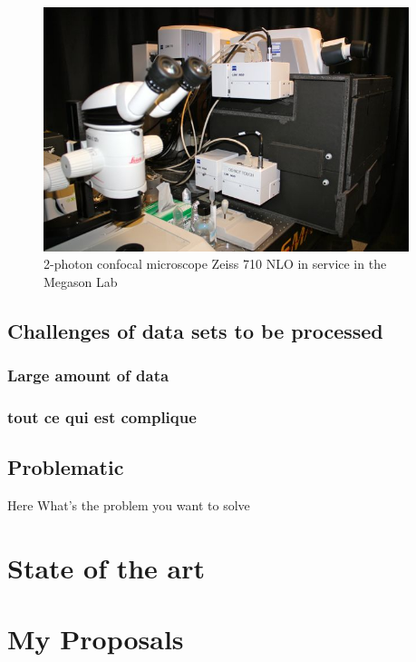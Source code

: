 \begin{figure}[htb]
\begin{center}
\leavevmode
\includegraphics[width=0.95\textwidth]{pictures/PICmicroscope}
\end{center}
\caption{2-photon confocal microscope Zeiss 710 NLO in service in the Megason Lab}
\label{fig:MicMegason}
\end{figure}

\clearpage

\section{Challenges of data sets to be processed}

\subsection{Large amount of data}
\subsection{tout ce qui est complique}

\section{Problematic}

Here What's the problem you want to solve

% 

\chapter{State of the art}
\chapter{My Proposals}
